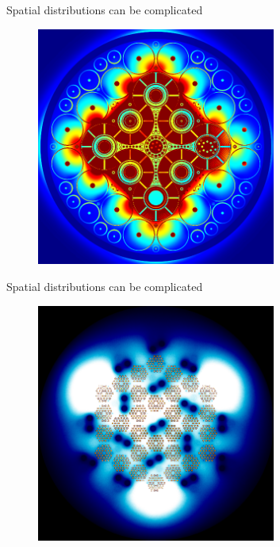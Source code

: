 \documentclass{beamer}
\begin{document}
    \begin{frame}{Spatial distributions can be complicated}
        \begin{figure}
            \centering
            \includegraphics[width=0.7\textwidth]{./img/spaceFlux2.png}
            \caption*{}
        \end{figure}
    \end{frame}

    \begin{frame}{Spatial distributions can be complicated}
        \begin{figure}
            \centering
            \includegraphics[width=0.7\textwidth]{./img/spaceFlux3.png}
            \caption*{}
        \end{figure}
    \end{frame}
\end{document}

